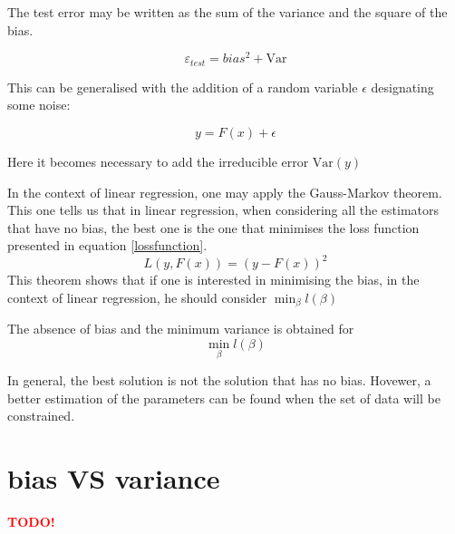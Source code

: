 \documentclass[a4paper]{tufte-book}
\newcommand{\TODO}{\textcolor{red}{\bf TODO!}\xspace}
\newcommand{\var}{\mathrm{Var}}
\begin{document}
The test error may be written as the sum of the variance and the square of 
the bias.

\begin{equation}
    \varepsilon_{test} = bias^2 + \var
\end{equation}


This can be generalised with the addition of a random variable $\epsilon$
designating some noise:

\begin{equation}
    y = F(x) + \epsilon
\end{equation} 

Here it becomes necessary to add the irreducible error $\var(y)$

In the context of linear regression, one may apply the Gauss-Markov theorem.
This one tells us that in linear regression, when considering all the estimators
that have no bias, the best one is the one that minimises the loss function
presented in equation \ref{lossfunction}. 
\begin{equation}
    L(y,F(x)) = (y-F(x))^2
    \label{lossfunction}
\end{equation}
This theorem shows that if one is interested in minimising the bias, in the
context of linear regression, he should consider $\min_\beta l(\beta)$

The absence of bias and the minimum variance is obtained for
\begin{equation}
    \min_\beta l(\beta)
\end{equation}

In general, the best solution is not the solution that has no bias.
Hovewer, a better estimation of the parameters can be found when the set of data
will be constrained.

\section{bias VS variance}

\TODO





\end{document}
